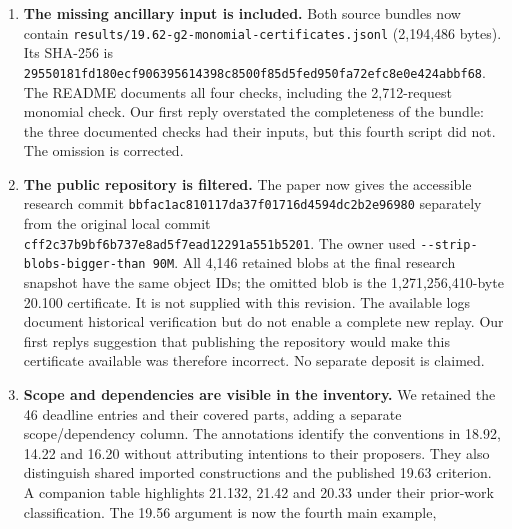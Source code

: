 \begin{enumerate}
  Since x-i is a unit, x belongs to (f), hence so does y. The surface
  relation u = x\^{}2 u - yv then gives u in (f). Thus (f) = (x,y,u),
  and the fixed scheme is the smooth reduced principal divisor with
  coordinate ring C{[}v{]}. The quotient is the original nodal surface
  localized at a+1, where a=x\^{}2. Its singular point (a,v,d)=(1,0,0)
  survives. This gives the counterexample under the globally principal
  reading too. We credit your suggestion and identify this restriction
  as a post-review strengthening. The explanation of the original
  surface now distinguishes the reduced Cartier divisor D from the
  principal double divisor 2D.
\item
  \textbf{The missing ancillary input is included.} Both source bundles
  now contain \nolinkurl{results/19.62-g2-monomial-certificates.jsonl}
  (2,194,486 bytes). Its SHA-256 is
  \nolinkurl{29550181fd180ecf906395614398c8500f85d5fed950fa72efc8e0e424abbf68}.
  The README documents all four checks, including the 2,712-request
  monomial check. Our first reply overstated the completeness of the
  bundle: the three documented checks had their inputs, but this fourth
  script did not. The omission is corrected.
\item
  \textbf{The public repository is filtered.} The paper now gives the
  accessible research commit
  \nolinkurl{bbfac1ac810117da37f01716d4594dc2b2e96980} separately from
  the original local commit
  \nolinkurl{cff2c37b9bf6b737e8ad5f7ead12291a551b5201}. The owner used
  \nolinkurl{--strip-blobs-bigger-than 90M}. All 4,146 retained blobs at
  the final research snapshot have the same object IDs; the omitted blob
  is the 1,271,256,410-byte 20.100 certificate. It is not supplied with
  this revision. The available logs document historical verification but
  do not enable a complete new replay. Our first reply\textquotesingle s
  suggestion that publishing the repository would make this certificate
  available was therefore incorrect. No separate deposit is claimed.
\item
  \textbf{Scope and dependencies are visible in the inventory.} We
  retained the 46 deadline entries and their covered parts, adding a
  separate scope/dependency column. The annotations identify the
  conventions in 18.92, 14.22 and 16.20 without attributing intentions
  to their proposers. They also distinguish shared imported
  constructions and the published 19.63 criterion. A companion table
  highlights 21.132, 21.42 and 20.33 under their prior-work
  classification. The 19.56 argument is now the fourth main example,

\end{enumerate}
